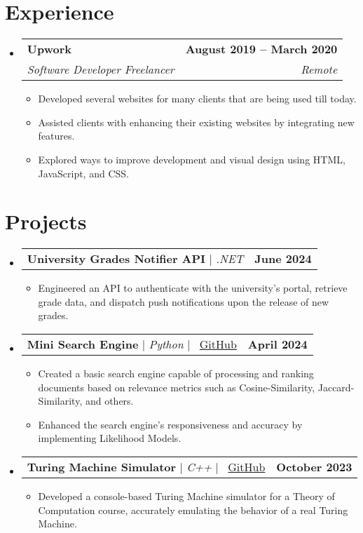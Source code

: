 \documentclass[letterpaper,11pt]{article}
\makeatletter
\newcommand{\resumeItem}[1]{
  \item\small{
    {#1 \vspace{-2pt}}
  }
}
\newcommand{\resumeSubheading}[4]{
  \vspace{-2pt}\item
    \begin{tabular*}{1.0\textwidth}[t]{l@{\extracolsep{\fill}}r}
      \textbf{#1} & \textbf{\small #2} \\
      \textit{\small#3} & \textit{\small #4} \\
    \end{tabular*}\vspace{-7pt}
}
\newcommand{\resumeProjectHeading}[2]{
    \item
    \begin{tabular*}{1.001\textwidth}{l@{\extracolsep{\fill}}r}
      \small#1 & \textbf{\small #2}\\
    \end{tabular*}\vspace{-7pt}
}
\newcommand{\resumeSubHeadingListStart}{\begin{itemize}[leftmargin=0.0in, label={}]}
\newcommand{\resumeSubHeadingListEnd}{\end{itemize}}
\newcommand{\resumeItemListStart}{\begin{itemize}}
\newcommand{\resumeItemListEnd}{\end{itemize}\vspace{-5pt}}
\makeatother
\begin{document}
\section{Experience}
  \resumeSubHeadingListStart

 
    \resumeSubheading
      {Upwork}{August 2019 -- March 2020}
      {Software Developer Freelancer}{Remote}
      \resumeItemListStart
        \resumeItem{Developed several websites for many clients that are being used till today.}
        \resumeItem{Assisted clients with enhancing their existing websites by integrating new features.}
        \resumeItem{Explored ways to improve development and visual design using HTML, JavaScript, and CSS.}
      \resumeItemListEnd
  
  \resumeSubHeadingListEnd
\vspace{-16pt}
\section{Projects}
    \vspace{-5pt}
    \resumeSubHeadingListStart
      \resumeProjectHeading
          {\textbf{University Grades Notifier API} $|$ \emph{.NET}}{June 2024}
          \resumeItemListStart
            \resumeItem{Engineered an API to authenticate with the university's portal, retrieve grade data, and dispatch push notifications upon the release of new grades.}
          \resumeItemListEnd
          \vspace{-13pt}
     \resumeProjectHeading
{\textbf{Mini Search Engine} $|$ \emph{Python} $|$ \faGithub \ \href{https://github.com/MohamedWElteir/Search-Engine-In-Python}{GitHub}}{April 2024}
\resumeItemListStart
\resumeItem{Created a basic search engine capable of processing and ranking documents based on relevance metrics such as Cosine-Similarity, Jaccard-Similarity, and others.}
\resumeItem{Enhanced the search engine's responsiveness and accuracy by implementing Likelihood Models.}
\resumeItemListEnd
          \vspace{-13pt}
          \resumeProjectHeading
{\textbf{Turing Machine Simulator} $|$ \emph{C++} $|$ \faGithub \ \href{https://github.com/MohamedWElteir/Turing-Machine-Simulator}{GitHub}}{October 2023}
\resumeItemListStart
\resumeItem{Developed a console-based Turing Machine simulator for a Theory of Computation course, accurately emulating the behavior of a real Turing Machine.}
\resumeItemListEnd
    \resumeSubHeadingListEnd
\vspace{-15pt}
\end{document}
